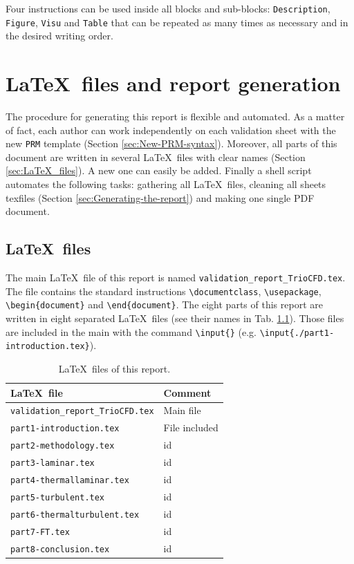 Four instructions can be used inside all blocks and sub-blocks: \texttt{Description},
\texttt{Figure}, \texttt{Visu} and \texttt{Table} that can be repeated
as many times as necessary and in the desired writing order.

\chapter{\label{chap:Validation-report-generation}\LaTeX~files and report generation}
The procedure for generating this report is flexible and automated.
As a matter of fact, each author can work independently on each validation
sheet with the new \texttt{PRM} template (Section \ref{sec:New-PRM-syntax}).
Moreover, all parts of this document are written in several \LaTeX~files
with clear names (Section \ref{sec:LaTeX_files}). A new one can
easily be added. Finally a shell script automates the following tasks:
gathering all \LaTeX~files, cleaning all sheets texfiles (Section
\ref{sec:Generating-the-report}) and making one single PDF document.
\section{\label{sec:LaTeX_files}\LaTeX~files}
The main \LaTeX~file of this report is named \texttt{validation\_report\_TrioCFD.tex}.
The file contains the standard instructions \texttt{\textbackslash{}documentclass},
\texttt{\textbackslash{}usepackage},\texttt{ \textbackslash{}begin\{document\}}
and \texttt{\textbackslash{}end\{document\}}. The eight parts of this
report are written in eight separated \LaTeX~files (see their names
in Tab. \ref{tab:LaTeX_files}). Those files are included in the main
with the command \texttt{\textbackslash{}input\{\}} (e.g. \texttt{\textbackslash{}input\{./part1-introduction.tex\}}).

\begin{table}[H]
\begin{centering}
\begin{tabular}{ll}
\hline 
\textbf{\LaTeX~file} & \textbf{Comment}\tabularnewline
\hline 
\texttt{validation\_report\_TrioCFD.tex} & Main file\tabularnewline
\texttt{part1-introduction.tex} & File included\tabularnewline
\texttt{part2-methodology.tex} & id\tabularnewline
\texttt{part3-laminar.tex} & id\tabularnewline
\texttt{part4-thermallaminar.tex} & id\tabularnewline
\texttt{part5-turbulent.tex} & id\tabularnewline
\texttt{part6-thermalturbulent.tex} & id\tabularnewline
\texttt{part7-FT.tex} & id\tabularnewline
\texttt{part8-conclusion.tex} & id\tabularnewline
\hline 
\end{tabular}
\par\end{centering}
\caption{\label{tab:LaTeX_files}\LaTeX~files of this report.}
\end{table}

